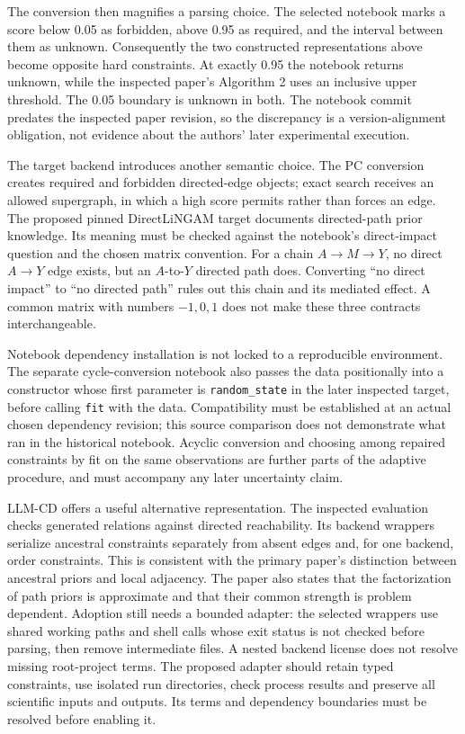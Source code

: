 The conversion then magnifies a parsing choice. The selected notebook
marks a score below 0.05 as forbidden, above 0.95 as required, and the
interval between them as unknown. Consequently the two constructed
representations above become opposite hard constraints. At exactly 0.95
the notebook returns unknown, while the inspected paper's Algorithm 2
uses an inclusive upper threshold. The 0.05 boundary is unknown in both.
The notebook commit predates the inspected paper revision, so the
discrepancy is a version-alignment obligation, not evidence about the
authors' later experimental execution.
\citep{exec14_iid_scd,v12_la_2402_01454}

The target backend introduces another semantic choice. The PC conversion
creates required and forbidden directed-edge objects; exact search
receives an allowed supergraph, in which a high score permits rather
than forces an edge. The proposed pinned DirectLiNGAM target documents
directed-path prior knowledge. Its meaning must be checked against the
notebook's direct-impact question and the chosen matrix convention. For
a chain \(A\to M\to Y\), no direct \(A\to Y\) edge exists, but an
\(A\)-to-\(Y\) directed path does. Converting ``no direct impact'' to
``no directed path'' rules out this chain and its mediated effect. A
common matrix with numbers \(-1,0,1\) does not make these three
contracts interchangeable. \citep{exec14_iid_scd,v13_sw_lingam}

Notebook dependency installation is not locked to a reproducible
environment. The separate cycle-conversion notebook also passes the data
positionally into a constructor whose first parameter is
\texttt{random\_state} in the later inspected target, before calling
\texttt{fit} with the data. Compatibility must be established at an
actual chosen dependency revision; this source comparison does not
demonstrate what ran in the historical notebook. Acyclic conversion and
choosing among repaired constraints by fit on the same observations are
further parts of the adaptive procedure, and must accompany any later
uncertainty claim. \citep{exec14_iid_scd,v13_sw_lingam}

LLM-CD offers a useful alternative representation. The inspected
evaluation checks generated relations against directed reachability. Its
backend wrappers serialize ancestral constraints separately from absent
edges and, for one backend, order constraints. This is consistent with
the primary paper's distinction between ancestral priors and local
adjacency. The paper also states that the factorization of path priors
is approximate and that their common strength is problem dependent.
\citep{exec14_iid_cd,v12_la_2306_16902} Adoption still needs a bounded
adapter: the selected wrappers use shared working paths and shell calls
whose exit status is not checked before parsing, then remove
intermediate files. A nested backend license does not resolve missing
root-project terms. The proposed adapter should retain typed
constraints, use isolated run directories, check process results and
preserve all scientific inputs and outputs. Its terms and dependency
boundaries must be resolved before enabling it.

